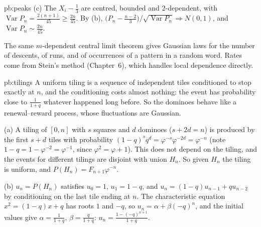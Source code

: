 \begin{solution}{pb:peaks}
(c) The $X_i-\frac13$ are centred, bounded and $2$-dependent, with $\operatorname{Var}P_n=\frac{2(n+1)}{45}\ge\frac{2n}{45}$. By (b), $\bigl(P_n-\frac{n-2}3\bigr)/\sqrt{\operatorname{Var}P_n}\Rightarrow N(0,1)$,
and $\operatorname{Var}P_n\sim\frac{2n}{45}$.

\leads The same $m$-dependent central limit theorem gives Gaussian laws for the number of descents, of runs, and of occurrences of a pattern in a random word. Rates come from Stein's method (Chapter~6), which handles local dependence directly.
\end{solution}

\begin{solution}{pb:tilings}
\idea A uniform tiling is a sequence of independent tiles conditioned to stop exactly at $n$, and the conditioning costs almost nothing: the event has probability
close to $\frac1{1+q}$ whatever happened long before. So the dominoes behave like a renewal--reward process, whose fluctuations are Gaussian.

\writeup (a) A tiling of $[0,n]$ with $s$ squares and $d$ dominoes ($s+2d=n$) is produced by the first $s+d$ tiles with probability
$(1-q)^sq^d=\varphi^{-s}\varphi^{-2d}=\varphi^{-n}$ (note $1-q=1-\varphi^{-2}=\varphi^{-1}$, since $\varphi^2=\varphi+1$). This does not depend on the tiling, and the
events for different tilings are disjoint with union $H_n$. So given $H_n$ the tiling is uniform, and $P(H_n)=F_{n+1}\varphi^{-n}$.

(b) $u_n=P(H_n)$ satisfies $u_0=1$, $u_1=1-q$, and $u_n=(1-q)u_{n-1}+qu_{n-2}$ by conditioning on the last tile ending at $n$. The characteristic equation
$x^2=(1-q)x+q$ has roots $1$ and $-q$, so $u_n=\alpha+\beta(-q)^n$, and the initial values give $\alpha=\frac1{1+q}$, $\beta=\frac q{1+q}$: $u_n=\frac{1-(-q)^{n+1}}{1+q}$.


\end{solution}
